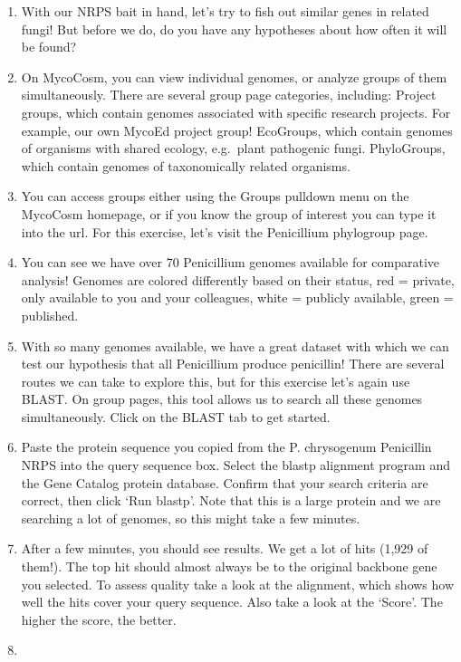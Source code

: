 \documentclass[
  letterpaper,
  DIV=11,
  numbers=noendperiod]{scrreprt}
\providecommand{\tightlist}{%
  \setlength{\itemsep}{0pt}\setlength{\parskip}{0pt}}
\begin{document}
\begin{enumerate}
\def\labelenumi{\arabic{enumi}.}
\tightlist
\item
  With our NRPS bait in hand, let's try to fish out similar genes in
  related fungi! But before we do, do you have any hypotheses about how
  often it will be found?
\item
  On MycoCosm, you can view individual genomes, or analyze groups of
  them simultaneously. There are several group page categories,
  including: Project groups, which contain genomes associated with
  specific research projects. For example, our own MycoEd project group!
  EcoGroups, which contain genomes of organisms with shared ecology,
  e.g.~plant pathogenic fungi. PhyloGroups, which contain genomes of
  taxonomically related organisms.
\item
  You can access groups either using the Groups pulldown menu on the
  MycoCosm homepage, or if you know the group of interest you can type
  it into the url. For this exercise, let's visit the Penicillium
  phylogroup page.
\item
  You can see we have over 70 Penicillium genomes available for
  comparative analysis! Genomes are colored differently based on their
  status, red = private, only available to you and your colleagues,
  white = publicly available, green = published.
\item
  With so many genomes available, we have a great dataset with which we
  can test our hypothesis that all Penicillium produce penicillin! There
  are several routes we can take to explore this, but for this exercise
  let's again use BLAST. On group pages, this tool allows us to search
  all these genomes simultaneously. Click on the BLAST tab to get
  started.
\item
  Paste the protein sequence you copied from the P. chrysogenum
  Penicillin NRPS into the query sequence box. Select the blastp
  alignment program and the Gene Catalog protein database. Confirm that
  your search criteria are correct, then click `Run blastp'. Note that
  this is a large protein and we are searching a lot of genomes, so this
  might take a few minutes.
\item
  After a few minutes, you should see results. We get a lot of hits
  (1,929 of them!). The top hit should almost always be to the original
  backbone gene you selected. To assess quality take a look at the
  alignment, which shows how well the hits cover your query sequence.
  Also take a look at the `Score'. The higher the score, the better.
\item

\end{enumerate}
\end{document}
